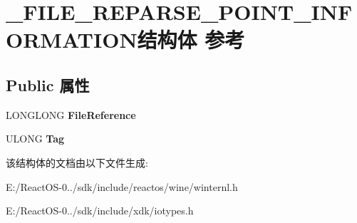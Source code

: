 \hypertarget{struct___f_i_l_e___r_e_p_a_r_s_e___p_o_i_n_t___i_n_f_o_r_m_a_t_i_o_n}{}\section{\+\_\+\+F\+I\+L\+E\+\_\+\+R\+E\+P\+A\+R\+S\+E\+\_\+\+P\+O\+I\+N\+T\+\_\+\+I\+N\+F\+O\+R\+M\+A\+T\+I\+O\+N结构体 参考}
\label{struct___f_i_l_e___r_e_p_a_r_s_e___p_o_i_n_t___i_n_f_o_r_m_a_t_i_o_n}
\subsection*{Public 属性}
\begin{DoxyCompactItemize}
\item 
\mbox{\label{struct___f_i_l_e___r_e_p_a_r_s_e___p_o_i_n_t___i_n_f_o_r_m_a_t_i_o_n_abf3009daf3c7cd0cebc818a8c5dd4d60}} 
L\+O\+N\+G\+L\+O\+NG {\bfseries File\+Reference}
\item 
\mbox{\label{struct___f_i_l_e___r_e_p_a_r_s_e___p_o_i_n_t___i_n_f_o_r_m_a_t_i_o_n_aedef4441b37a603306bb5a6323634d5e}} 
U\+L\+O\+NG {\bfseries Tag}
\end{DoxyCompactItemize}


该结构体的文档由以下文件生成\+:\begin{DoxyCompactItemize}
\item 
E\+:/\+React\+O\+S-\/0../sdk/include/reactos/wine/winternl.\+h\item 
E\+:/\+React\+O\+S-\/0../sdk/include/xdk/iotypes.\+h\end{DoxyCompactItemize}
